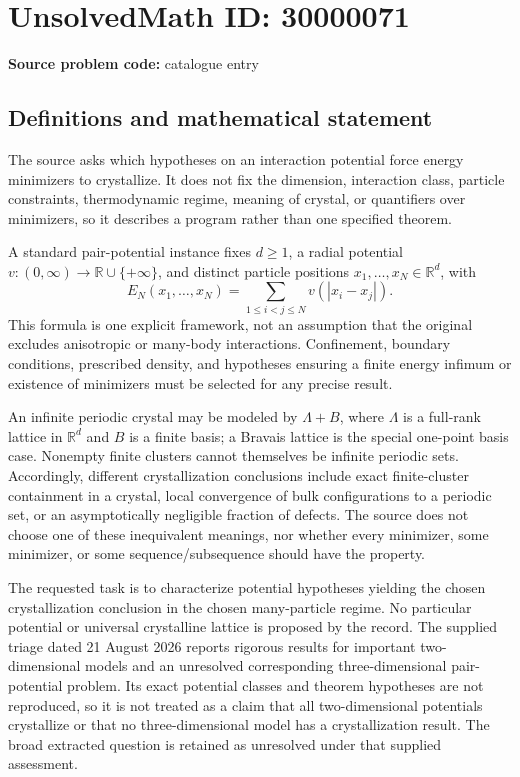 \documentclass[11pt]{article}
\newcommand{\R}{\mathbb{R}}
\begin{document}
\section*{UnsolvedMath ID: 30000071}
\textbf{Source problem code:} catalogue entry
\subsection{Definitions and mathematical statement}
The source asks which hypotheses on an interaction potential force energy minimizers to crystallize. It does not fix the dimension, interaction class, particle constraints, thermodynamic regime, meaning of crystal, or quantifiers over minimizers, so it describes a program rather than one specified theorem.

A standard pair-potential instance fixes \(d\geq1\), a radial potential \(v:(0,\infty)\to\R\cup\{+\infty\}\), and distinct particle positions \(x_1,\ldots,x_N\in\R^d\), with
\[
 E_N(x_1,\ldots,x_N)=\sum_{1\leq i<j\leq N}v(|x_i-x_j|).
\]
This formula is one explicit framework, not an assumption that the original excludes anisotropic or many-body interactions. Confinement, boundary conditions, prescribed density, and hypotheses ensuring a finite energy infimum or existence of minimizers must be selected for any precise result.

An infinite periodic crystal may be modeled by \(\Lambda+B\), where \(\Lambda\) is a full-rank lattice in \(\R^d\) and \(B\) is a finite basis; a Bravais lattice is the special one-point basis case. Nonempty finite clusters cannot themselves be infinite periodic sets. Accordingly, different crystallization conclusions include exact finite-cluster containment in a crystal, local convergence of bulk configurations to a periodic set, or an asymptotically negligible fraction of defects. The source does not choose one of these inequivalent meanings, nor whether every minimizer, some minimizer, or some sequence/subsequence should have the property.

The requested task is to characterize potential hypotheses yielding the chosen crystallization conclusion in the chosen many-particle regime. No particular potential or universal crystalline lattice is proposed by the record. The supplied triage dated 21 August 2026 reports rigorous results for important two-dimensional models and an unresolved corresponding three-dimensional pair-potential problem. Its exact potential classes and theorem hypotheses are not reproduced, so it is not treated as a claim that all two-dimensional potentials crystallize or that no three-dimensional model has a crystallization result. The broad extracted question is retained as unresolved under that supplied assessment.
\end{document}
